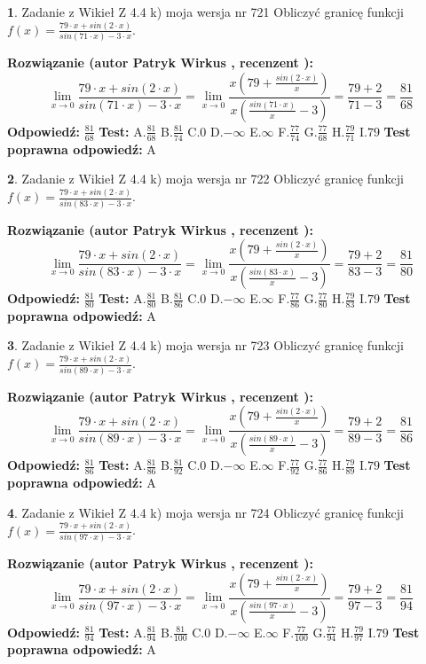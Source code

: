 \documentclass[12pt, a4paper]{article}
\theoremstyle{definition} %
\newtheorem{zad}{}
\newcommand{\zadStart}[1]{\begin{zad}#1\newline}
\newcommand{\zadStop}{\end{zad}}
\newcommand{\rozwStart}[2]{\noindent \textbf{Rozwiązanie (autor #1 , recenzent #2): }\newline}
\newcommand{\rozwStop}{\newline}
\newcommand{\odpStart}{\noindent \textbf{Odpowiedź:}\newline}
\newcommand{\odpStop}{\newline}
\newcommand{\testStart}{\noindent \textbf{Test:}\newline}
\newcommand{\testStop}{\newline}
\newcommand{\kluczStart}{\noindent \textbf{Test poprawna odpowiedź:}\newline}
\newcommand{\kluczStop}{\newline}
\begin{document}
\zadStart{Zadanie z Wikieł Z 4.4 k) moja wersja nr 721}
Obliczyć granicę funkcji $f(x)=\frac{79\cdot x +sin(2\cdot x)}{sin(71\cdot x) -3\cdot x}$.
\zadStop
\rozwStart{Patryk Wirkus}{}
$$\lim\limits_{x\to 0}\frac{79\cdot x +sin(2\cdot x)}{sin(71\cdot x) -3\cdot x}
=\lim\limits_{x\to 0}\frac{x(79+\frac{sin(2\cdot x)}{x})}{x(\frac{sin(71\cdot x)}{x}-3)}
=\frac{79+2}{71-3} = \frac{81}{68}$$
\rozwStop
\odpStart
$\frac{81}{68}$
\odpStop
\testStart
A.$\frac{81}{68}$
B.$\frac{81}{74}$
C.$0$
D.$-\infty$
E.$\infty$
F.$\frac{77}{74}$
G.$\frac{77}{68}$
H.$\frac{79}{71}$
I.$79$
\testStop
\kluczStart
A
\kluczStop



\zadStart{Zadanie z Wikieł Z 4.4 k) moja wersja nr 722}
Obliczyć granicę funkcji $f(x)=\frac{79\cdot x +sin(2\cdot x)}{sin(83\cdot x) -3\cdot x}$.
\zadStop
\rozwStart{Patryk Wirkus}{}
$$\lim\limits_{x\to 0}\frac{79\cdot x +sin(2\cdot x)}{sin(83\cdot x) -3\cdot x}
=\lim\limits_{x\to 0}\frac{x(79+\frac{sin(2\cdot x)}{x})}{x(\frac{sin(83\cdot x)}{x}-3)}
=\frac{79+2}{83-3} = \frac{81}{80}$$
\rozwStop
\odpStart
$\frac{81}{80}$
\odpStop
\testStart
A.$\frac{81}{80}$
B.$\frac{81}{86}$
C.$0$
D.$-\infty$
E.$\infty$
F.$\frac{77}{86}$
G.$\frac{77}{80}$
H.$\frac{79}{83}$
I.$79$
\testStop
\kluczStart
A
\kluczStop



\zadStart{Zadanie z Wikieł Z 4.4 k) moja wersja nr 723}
Obliczyć granicę funkcji $f(x)=\frac{79\cdot x +sin(2\cdot x)}{sin(89\cdot x) -3\cdot x}$.
\zadStop
\rozwStart{Patryk Wirkus}{}
$$\lim\limits_{x\to 0}\frac{79\cdot x +sin(2\cdot x)}{sin(89\cdot x) -3\cdot x}
=\lim\limits_{x\to 0}\frac{x(79+\frac{sin(2\cdot x)}{x})}{x(\frac{sin(89\cdot x)}{x}-3)}
=\frac{79+2}{89-3} = \frac{81}{86}$$
\rozwStop
\odpStart
$\frac{81}{86}$
\odpStop
\testStart
A.$\frac{81}{86}$
B.$\frac{81}{92}$
C.$0$
D.$-\infty$
E.$\infty$
F.$\frac{77}{92}$
G.$\frac{77}{86}$
H.$\frac{79}{89}$
I.$79$
\testStop
\kluczStart
A
\kluczStop



\zadStart{Zadanie z Wikieł Z 4.4 k) moja wersja nr 724}
Obliczyć granicę funkcji $f(x)=\frac{79\cdot x +sin(2\cdot x)}{sin(97\cdot x) -3\cdot x}$.
\zadStop
\rozwStart{Patryk Wirkus}{}
$$\lim\limits_{x\to 0}\frac{79\cdot x +sin(2\cdot x)}{sin(97\cdot x) -3\cdot x}
=\lim\limits_{x\to 0}\frac{x(79+\frac{sin(2\cdot x)}{x})}{x(\frac{sin(97\cdot x)}{x}-3)}
=\frac{79+2}{97-3} = \frac{81}{94}$$
\rozwStop
\odpStart
$\frac{81}{94}$
\odpStop
\testStart
A.$\frac{81}{94}$
B.$\frac{81}{100}$
C.$0$
D.$-\infty$
E.$\infty$
F.$\frac{77}{100}$
G.$\frac{77}{94}$
H.$\frac{79}{97}$
I.$79$
\testStop
\kluczStart
A
\kluczStop
\end{document}
